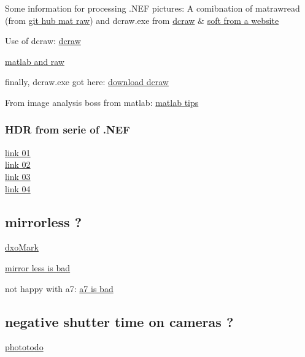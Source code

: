 \documentclass[lineno]{jfm}
\begin{document}
Some information for processing .NEF pictures:
A comibnation of matrawread (from \href{https://github.com/QiuJueqin/MatRaw}{git hub mat raw}) and dcraw.exe from \href{https://www.dechifro.org/dcraw/}{dcraw}
$\&$ \href{https://www.fastpictureviewer.com/downloads/#links}{soft from a website}

Use of dcraw: \href{https://www.programmersought.com/article/46784093292/}{dcraw}

\href{https://www.cnba.it/contenuti/uploads/2016/03/Processing-RAW-Images-in-MATLAB-Sumner.pdf}{matlab and raw}

finally, dcraw.exe got here: \href{https://fr.osdn.net/projects/sfnet_dcrawnet/downloads/dcraw.exe/}{download dcraw}

From image analysis boss from matlab:
\href{https://blogs.mathworks.com/steve/2011/03/08/tips-for-reading-a-camera-raw-file-into-matlab/}{matlab tips}


\subsubsection{HDR from serie of .NEF}

\noindent \href{https://pypi.org/project/rawhdr/}{link 01}\\
\noindent \href{https://github.com/fthaler/rawhdr}{link 02}\\
\noindent \href{https://learnopencv.com/high-dynamic-range-hdr-imaging-using-opencv-cpp-python/}{link 03}\\
\noindent \href{https://stackoverflow.com/questions/30010227/how-could-i-get-the-raw-pixel-data-out-of-a-nef-file-using-python}{link 04}\\


\subsection{mirrorless ?}

\href{https://www.dxomark.com/things-are-heating-up-in-the-full-frame-mirrorless-camera-market/}{dxoMark}

\href{https://www.jmpeltier.com/disadvantages-of-mirrorless-cameras/}{mirror less is bad}

not happy with a7: \href{https://fstoppers.com/originals/i-wish-id-known-i-moved-sony-366521}{a7 is bad}


\subsection{negative shutter time on cameras ?}
\href{https://photodoto.com/here-is-why-mirrorless-cameras-have-shutters/}{phototodo}
\end{document}
